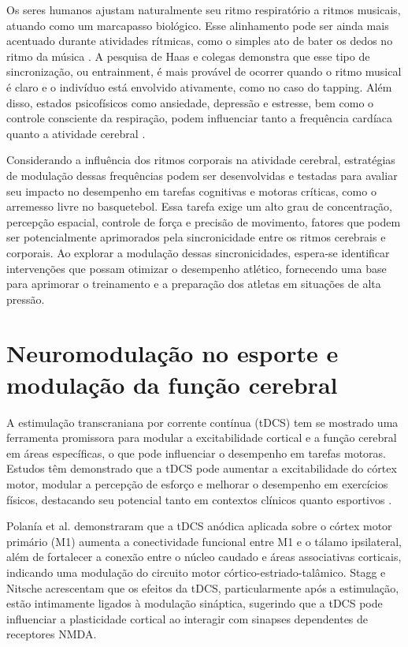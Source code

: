 Os seres humanos ajustam naturalmente seu ritmo respiratório a ritmos musicais, atuando como um marcapasso biológico. Esse alinhamento pode ser ainda mais acentuado durante atividades rítmicas, como o simples ato de bater os dedos no ritmo da música \cite{haas1985effects}. A pesquisa de Haas e colegas demonstra que esse tipo de sincronização, ou entrainment, é mais provável de ocorrer quando o ritmo musical é claro e o indivíduo está envolvido ativamente, como no caso do tapping. Além disso, estados psicofísicos como ansiedade, depressão e estresse, bem como o controle consciente da respiração, podem influenciar tanto a frequência cardíaca quanto a atividade cerebral \cite{criscuolo2022cognition}.

Considerando a influência dos ritmos corporais na atividade cerebral, estratégias de modulação dessas frequências podem ser desenvolvidas e testadas para avaliar seu impacto no desempenho em tarefas cognitivas e motoras críticas, como o arremesso livre no basquetebol. Essa tarefa exige um alto grau de concentração, percepção espacial, controle de força e precisão de movimento, fatores que podem ser potencialmente aprimorados pela sincronicidade entre os ritmos cerebrais e corporais. Ao explorar a modulação dessas sincronicidades, espera-se identificar intervenções que possam otimizar o desempenho atlético, fornecendo uma base para aprimorar o treinamento e a preparação dos atletas em situações de alta pressão.

\section{Neuromodulação no esporte e modulação da função cerebral}
A estimulação transcraniana por corrente contínua (tDCS) tem se mostrado uma ferramenta promissora para modular a excitabilidade cortical e a função cerebral em áreas específicas, o que pode influenciar o desempenho em tarefas motoras. Estudos têm demonstrado que a tDCS pode aumentar a excitabilidade do córtex motor, modular a percepção de esforço e melhorar o desempenho em exercícios físicos, destacando seu potencial tanto em contextos clínicos quanto esportivos \cite{nitsche2000excitability, okano2013estimulacao}.

Polanía et al. \cite{polania2012modulating} demonstraram que a tDCS anódica aplicada sobre o córtex motor primário (M1) aumenta a conectividade funcional entre M1 e o tálamo ipsilateral, além de fortalecer a conexão entre o núcleo caudado e áreas associativas corticais, indicando uma modulação do circuito motor córtico-estriado-talâmico. Stagg e Nitsche \cite{stagg2011physiological} acrescentam que os efeitos da tDCS, particularmente após a estimulação, estão intimamente ligados à modulação sináptica, sugerindo que a tDCS pode influenciar a plasticidade cortical ao interagir com sinapses dependentes de receptores NMDA.


